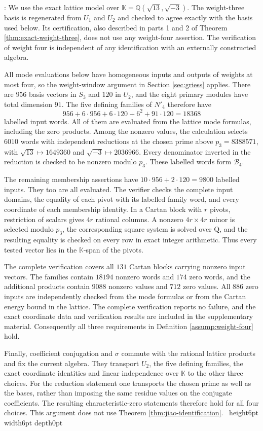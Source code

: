 \documentclass[leqno]{article}
\newcommand{\K}{\ensuremath{\mathbb{K}}}
\newcommand{\Q}{\mathrm{Q}}
\newcommand{\qed}{\hfill \vrule height6pt  width6pt depth0pt}
\newenvironment{proof}[1][]{\noindent {\it Proof #1} : }{\hbox{~}\qed
\smallskip
}
\numberwithin{equation}{section}
\begin{document}
\begin{proof}
We use the exact lattice model over $\K = \mathbb{Q}(\sqrt{13},\sqrt{-3})$. The weight-three basis is regenerated from $U_1$ and $U_2$ and checked to agree exactly with the basis used below. Its certification, also described in parts 1 and 2 of Theorem \ref{thm:exact-weight-three}, does not use any weight-four assertion. The verification of weight four is independent of any identification with an externally constructed algebra.

All mode evaluations below have homogeneous inputs and outputs of weights at most four, so the weight-window argument in Section \ref{sec:griess} applies. There are $956$ basis vectors in $S_3$ and $120$ in $U_2$, and the eight primary modules have total dimension $91$. The five defining families of $N'_4$ therefore have
\[
956 + 6 \cdot 956 + 6 \cdot 120 + 6^2 + 91 \cdot 120 = 18368
\]
labelled input words. All of them are evaluated from the lattice mode formulas, including the zero products. Among the nonzero values, the calculation selects $6010$ words with independent reductions at the chosen prime above $p_3 = 8388571$, with $\sqrt{13} \mapsto 1649360$ and $\sqrt{-3} \mapsto 2036966$. Every denominator inverted in the reduction is checked to be nonzero modulo $p_3$. These labelled words form $\mathcal B_4$.

The remaining membership assertions have $10 \cdot 956+2 \cdot 120 = 9800$ labelled inputs. They too are all evaluated. The verifier checks the complete input domains, the equality of each pivot with its labelled family word, and every coordinate of each membership identity. In a Cartan block with $r$ pivots, restriction of scalars gives $4r$ rational columns. A nonzero $4r \times 4r$ minor is selected modulo $p_3$, the corresponding square system is solved over $\Q$, and the resulting equality is checked on every row in exact integer arithmetic. Thus every tested vector lies in the $\K$-span of the pivots.

The complete verification covers all $131$ Cartan blocks carrying nonzero input vectors. The families contain $18194$ nonzero words and $174$ zero words, and the additional products contain $9088$ nonzero values and $712$ zero values. All $886$ zero inputs are independently checked from the mode formulas or from the Cartan energy bound in the lattice. The complete verification reports no failure, and the exact coordinate data and verification results are included in the supplementary material. Consequently all three requirements in Definition \ref{assump:weight-four} hold.

Finally, coefficient conjugation and $\sigma$ commute with the rational lattice products and fix the current algebra. They transport $U_2$, the five defining families, the exact coordinate identities and linear independence over $\K$ to the other three choices. For the reduction statement one transports the chosen prime as well as the bases, rather than imposing the same residue values on the conjugate coefficients. The resulting characteristic-zero statements therefore hold for all four choices. This argument does not use Theorem \ref{thm:jiao-identification}.
\end{proof}
\end{document}
